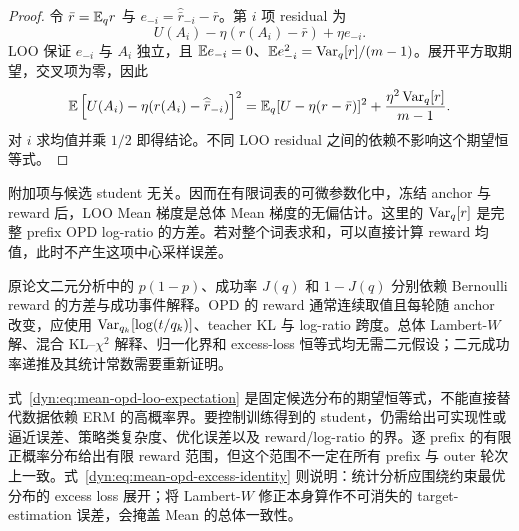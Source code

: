 \begin{proof}
令 $\bar r=\mathbb E_qr$ 与 $e_{-i}=\widehat{\bar r}_{-i}-\bar r$。第 $i$ 项 residual 为
\begin{equation*}
 U(A_i)-\eta(r(A_i)-\bar r)+\eta e_{-i}.
\end{equation*}
LOO 保证 $e_{-i}$ 与 $A_i$ 独立，且 $\mathbb E e_{-i}=0$、$\mathbb E e_{-i}^2=\operatorname{Var}_q[r]/(m-1)$。展开平方取期望，交叉项为零，因此
\begin{equation*}
 \mathbb E\left[U(A_i)-\eta(r(A_i)-\widehat{\bar r}_{-i})\right]^2
 =\mathbb E_q[U-\eta(r-\bar r)]^2
  +\frac{\eta^2\operatorname{Var}_q[r]}{m-1}.
\end{equation*}
对 $i$ 求均值并乘 $1/2$ 即得结论。不同 LOO residual 之间的依赖不影响这个期望恒等式。
\end{proof}

附加项与候选 student 无关。因而在有限词表的可微参数化中，冻结 anchor 与 reward 后，LOO Mean 梯度是总体 Mean 梯度的无偏估计。这里的 $\operatorname{Var}_q[r]$ 是完整 prefix OPD log-ratio 的方差。若对整个词表求和，可以直接计算 reward 均值，此时不产生这项中心采样误差。

原论文二元分析中的 $p(1-p)$、成功率 $J(q)$ 和 $1-J(q)$ 分别依赖 Bernoulli reward 的方差与成功事件解释。OPD 的 reward 通常连续取值且每轮随 anchor 改变，应使用 $\operatorname{Var}_{q_k}[\log(t/q_k)]$、teacher KL 与 log-ratio 跨度。总体 Lambert-$W$ 解、混合 KL--$\chi^2$ 解释、归一化界和 excess-loss 恒等式均无需二元假设；二元成功率递推及其统计常数需要重新证明。

式~\eqref{dyn:eq:mean-opd-loo-expectation} 是固定候选分布的期望恒等式，不能直接替代数据依赖 ERM 的高概率界。要控制训练得到的 student，仍需给出可实现性或逼近误差、策略类复杂度、优化误差以及 reward/log-ratio 的界。逐 prefix 的有限正概率分布给出有限 reward 范围，但这个范围不一定在所有 prefix 与 outer 轮次上一致。式~\eqref{dyn:eq:mean-opd-excess-identity} 则说明：统计分析应围绕约束最优分布的 excess loss 展开；将 Lambert-$W$ 修正本身算作不可消失的 target-estimation 误差，会掩盖 Mean 的总体一致性。
